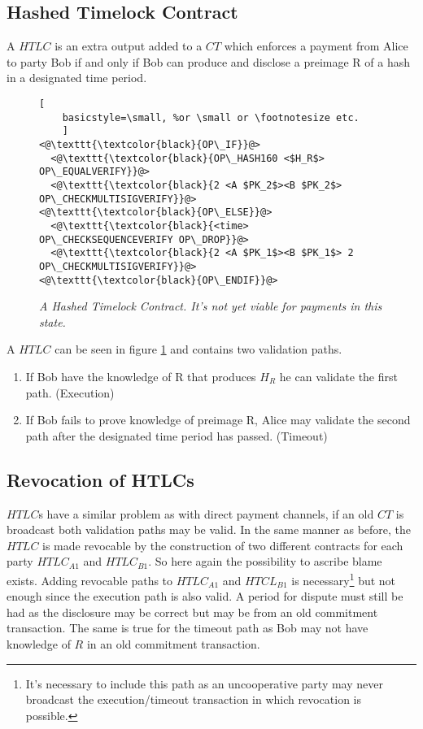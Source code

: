 \subsection{Hashed Timelock Contract}

A $HTLC$ is an extra output added to a $CT$ which enforces a payment from Alice to party Bob if and only if Bob can produce and disclose a preimage R of a hash in a designated time period. 

\begin{figure}[hbt!]
	\centering
	\begin{lstlisting}[
	basicstyle=\small, %or \small or \footnotesize etc.
	]
<@\texttt{\textcolor{black}{OP\_IF}}@>
  <@\texttt{\textcolor{black}{OP\_HASH160 <$H_R$> OP\_EQUALVERIFY}}@>
  <@\texttt{\textcolor{black}{2 <A $PK_2$><B $PK_2$> OP\_CHECKMULTISIGVERIFY}}@>  
<@\texttt{\textcolor{black}{OP\_ELSE}}@>
  <@\texttt{\textcolor{black}{<time> OP\_CHECKSEQUENCEVERIFY OP\_DROP}}@>
  <@\texttt{\textcolor{black}{2 <A $PK_1$><B $PK_1$> 2 OP\_CHECKMULTISIGVERIFY}}@>
<@\texttt{\textcolor{black}{OP\_ENDIF}}@>
	\end{lstlisting}
	
	\caption{\textit{ A Hashed Timelock Contract. It's not yet viable for payments in this state.
	}}
	\label{fig:HTLC}
\end{figure}

A $HTLC$ can be seen in figure \ref{fig:HTLC} and contains two validation paths. 

\begin{enumerate}
	\item If Bob have the knowledge of R that produces $H_{R}$ he can validate the first path. (Execution)
	\item If Bob fails to prove knowledge of preimage R, Alice may validate the second path after the designated time period has passed. (Timeout)
\end{enumerate}

\subsection{Revocation of HTLCs}

$HTLC$s have a similar problem as with direct payment channels, if an old $CT$ is broadcast both validation paths may be valid. In the same manner as before, the $HTLC$ is made revocable by the construction of two different contracts for each party $HTLC_{A1}$ and $HTLC_{B1}$. So here again the possibility to ascribe blame exists. Adding revocable paths to $HTLC_{A1}$ and $HTCL_{B1}$ is necessary\footnote{It's necessary to include this path as an uncooperative party may never broadcast the execution/timeout transaction in which revocation is possible.} but not enough since the execution path is also valid. A period for dispute must still be had as the disclosure may be correct but may be from an old commitment transaction. The same is true for the timeout path as Bob may not have knowledge of $R$ in an old commitment transaction.   

